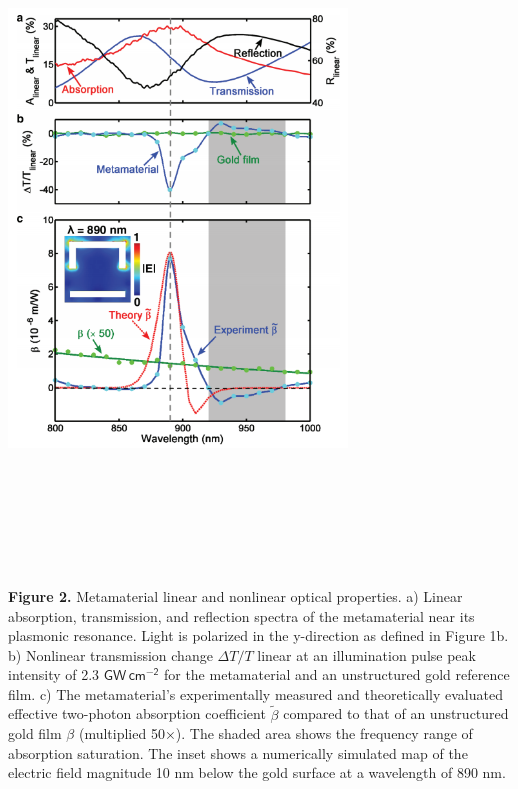 \documentclass[]{article}
\begin{document}
\centerline{\includegraphics[width=9cm,height=18cm]{image/001_02.png}}
\textbf{Figure 2.} Metamaterial linear and nonlinear optical properties.
a) Linear absorption, transmission, and reflection spectra of the
metamaterial near its plasmonic resonance. Light is polarized in the
y-direction as defined in Figure 1b. b) Nonlinear transmission change
\( \Delta T/T\) linear at an illumination pulse peak intensity of 2.3
\( \mathsf{GW\,cm^{-2}}\) for the metamaterial and an unstructured
gold reference film. c) The metamaterial's experimentally measured and
theoretically evaluated effective two-photon absorption coefficient
\( \tilde \beta\) compared to that of an unstructured gold film
\( \beta\) (multiplied 50×). The shaded area shows the frequency
range of absorption saturation. The inset shows a numerically simulated
map of the electric field magnitude 10 nm below the gold surface at a
wavelength of 890 nm.
\end{document}
